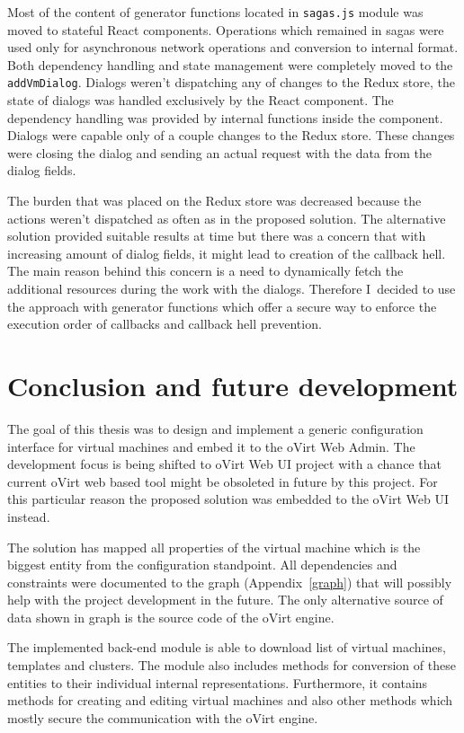 Most of the content of generator functions located in \texttt{sagas.js} module was moved to stateful React components. Operations which remained in sagas were used only for asynchronous network operations and conversion to internal format. Both dependency handling and state management were completely moved to the \texttt{addVmDialog}. Dialogs weren't dispatching any of changes to the Redux store, the state of dialogs was handled exclusively by the React component. The dependency handling was provided by internal functions inside the component. Dialogs were capable only of a couple changes to the Redux store. These changes were closing the dialog and sending an actual request with the data from the dialog fields.

The burden that was placed on the Redux store was decreased because the actions weren't dispatched as often as in the proposed solution. The alternative solution provided suitable results at time but there was a concern that with increasing amount of dialog fields, it might lead to creation of the callback hell. The main reason behind this concern is a need to dynamically fetch the additional resources during the work with the dialogs. Therefore I~decided to use the approach with generator functions which offer a secure way to enforce the execution order of callbacks and callback hell prevention.

\chapter{Conclusion and future development}
The goal of this thesis was to design and implement a generic configuration interface for virtual machines and embed it to the oVirt Web Admin. The development focus is being shifted to oVirt Web UI project with a chance that current oVirt web based tool might be obsoleted in future by this project. For this particular reason the proposed solution was embedded to the oVirt Web UI instead.

The solution has mapped all properties of the virtual machine which is the biggest entity from the configuration standpoint. All dependencies and constraints were documented to the graph (Appendix~\ref{graph}) that will possibly help with the project development in the future. The only alternative source of data shown in graph is the source code of the oVirt engine.

The implemented back-end module is able to download list of virtual machines, templates and clusters. The module also includes methods for conversion of these entities to their individual internal representations. Furthermore, it contains methods for creating and editing virtual machines and also other methods which mostly secure the communication with the oVirt engine.

